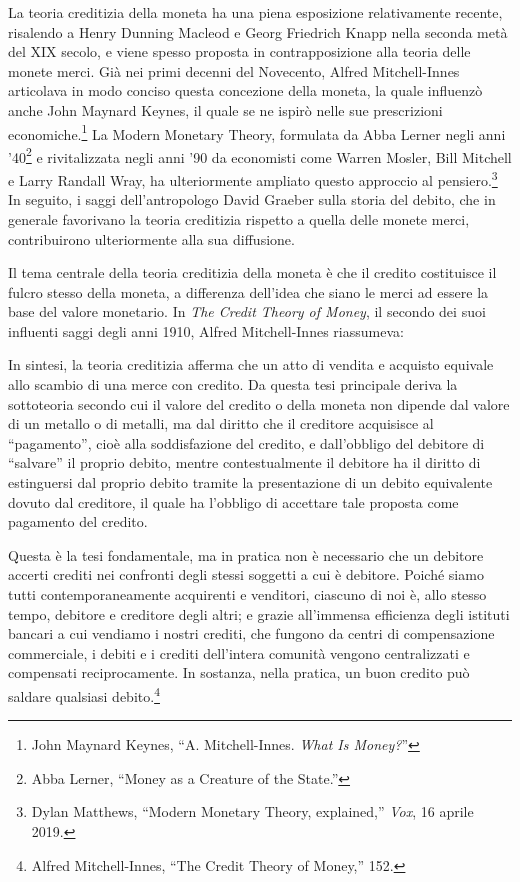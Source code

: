 \documentclass[
  a5paper,
  smalldemyvopaper,10pt,twoside,onecolumn,openright,extrafontsizes,hidelinks]{memoir}
\renewenvironment{quote}%
               {\list{}{\rightmargin=.6cm\leftmargin=.6cm}%
                \itshape \item[]}%
               {\endlist}
\begin{document}
La teoria creditizia della moneta ha una piena esposizione relativamente
recente, risalendo a Henry Dunning Macleod e Georg Friedrich Knapp nella
seconda metà del XIX secolo, e viene spesso proposta in contrapposizione
alla teoria delle monete merci. Già nei primi decenni del Novecento,
Alfred Mitchell-Innes articolava in modo conciso questa concezione della
moneta, la quale influenzò anche John Maynard Keynes, il quale se ne
ispirò nelle sue prescrizioni economiche.\footnote{John Maynard Keynes,
  ``A. Mitchell-Innes. \emph{What Is Money?}''} La Modern Monetary
Theory, formulata da Abba Lerner negli anni '40\footnote{Abba Lerner,
  ``Money as a Creature of the State.''} e rivitalizzata negli anni '90
da economisti come Warren Mosler, Bill Mitchell e Larry Randall Wray, ha
ulteriormente ampliato questo approccio al pensiero.\footnote{Dylan
  Matthews, ``Modern Monetary Theory, explained,'' \emph{Vox}, 16 aprile
  2019.} In seguito, i saggi dell'antropologo David Graeber sulla storia
del debito, che in generale favorivano la teoria creditizia rispetto a
quella delle monete merci, contribuirono ulteriormente alla sua
diffusione.

Il tema centrale della teoria creditizia della moneta è che il credito
costituisce il fulcro stesso della moneta, a differenza dell'idea che
siano le merci ad essere la base del valore monetario. In \emph{The
Credit Theory of Money}, il secondo dei suoi influenti saggi degli anni
1910, Alfred Mitchell-Innes riassumeva:

\begin{quote}
In sintesi, la teoria creditizia afferma che un atto di vendita e
acquisto equivale allo scambio di una merce con credito. Da questa tesi
principale deriva la sottoteoria secondo cui il valore del credito o
della moneta non dipende dal valore di un metallo o di metalli, ma dal
diritto che il creditore acquisisce al ``pagamento'', cioè alla
soddisfazione del credito, e dall'obbligo del debitore di ``salvare'' il
proprio debito, mentre contestualmente il debitore ha il diritto di
estinguersi dal proprio debito tramite la presentazione di un debito
equivalente dovuto dal creditore, il quale ha l'obbligo di accettare
tale proposta come pagamento del credito.

Questa è la tesi fondamentale, ma in pratica non è necessario che un
debitore accerti crediti nei confronti degli stessi soggetti a cui è
debitore. Poiché siamo tutti contemporaneamente acquirenti e venditori,
ciascuno di noi è, allo stesso tempo, debitore e creditore degli altri;
e grazie all'immensa efficienza degli istituti bancari a cui vendiamo i
nostri crediti, che fungono da centri di compensazione commerciale, i
debiti e i crediti dell'intera comunità vengono centralizzati e
compensati reciprocamente. In sostanza, nella pratica, un buon credito
può saldare qualsiasi debito.\footnote{Alfred Mitchell-Innes, ``The
  Credit Theory of Money,'' 152.}
\end{quote}
\end{document}
